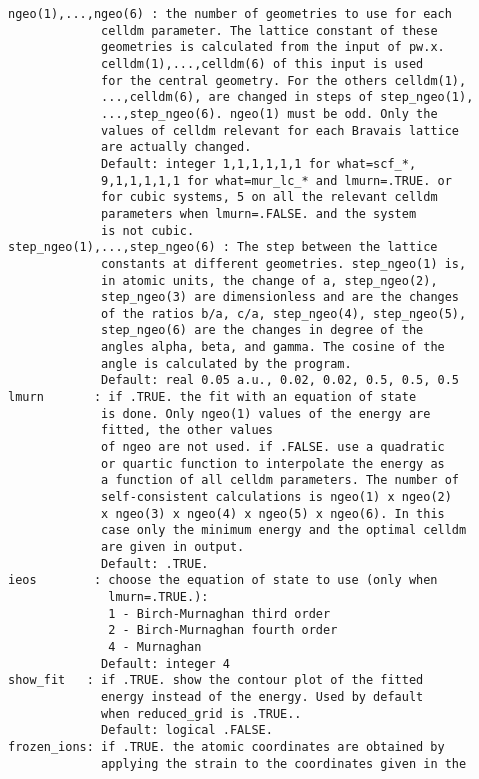 \documentclass[12pt,a4paper,twoside]{report}
\begin{document}
\begin{verbatim}
ngeo(1),...,ngeo(6) : the number of geometries to use for each 
             celldm parameter. The lattice constant of these 
             geometries is calculated from the input of pw.x. 
             celldm(1),...,celldm(6) of this input is used 
             for the central geometry. For the others celldm(1),
             ...,celldm(6), are changed in steps of step_ngeo(1),
             ...,step_ngeo(6). ngeo(1) must be odd. Only the 
             values of celldm relevant for each Bravais lattice 
             are actually changed.
             Default: integer 1,1,1,1,1,1 for what=scf_*, 
             9,1,1,1,1,1 for what=mur_lc_* and lmurn=.TRUE. or 
             for cubic systems, 5 on all the relevant celldm 
             parameters when lmurn=.FALSE. and the system
             is not cubic.
step_ngeo(1),...,step_ngeo(6) : The step between the lattice 
             constants at different geometries. step_ngeo(1) is, 
             in atomic units, the change of a, step_ngeo(2), 
             step_ngeo(3) are dimensionless and are the changes 
             of the ratios b/a, c/a, step_ngeo(4), step_ngeo(5), 
             step_ngeo(6) are the changes in degree of the 
             angles alpha, beta, and gamma. The cosine of the 
             angle is calculated by the program.
             Default: real 0.05 a.u., 0.02, 0.02, 0.5, 0.5, 0.5
lmurn       : if .TRUE. the fit with an equation of state
             is done. Only ngeo(1) values of the energy are 
             fitted, the other values 
             of ngeo are not used. if .FALSE. use a quadratic 
             or quartic function to interpolate the energy as 
             a function of all celldm parameters. The number of 
             self-consistent calculations is ngeo(1) x ngeo(2) 
             x ngeo(3) x ngeo(4) x ngeo(5) x ngeo(6). In this 
             case only the minimum energy and the optimal celldm 
             are given in output. 
             Default: .TRUE. 
ieos        : choose the equation of state to use (only when 
              lmurn=.TRUE.):
              1 - Birch-Murnaghan third order
              2 - Birch-Murnaghan fourth order
              4 - Murnaghan
             Default: integer 4
show_fit   : if .TRUE. show the contour plot of the fitted 
             energy instead of the energy. Used by default 
             when reduced_grid is .TRUE..
             Default: logical .FALSE.
frozen_ions: if .TRUE. the atomic coordinates are obtained by 
             applying the strain to the coordinates given in the 

\end{verbatim}
\end{document}

